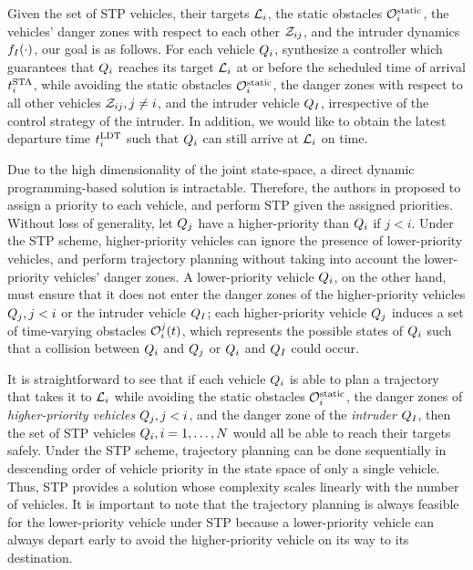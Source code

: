 Given the set of STP vehicles, their targets $\mathcal{L}_i$, the static obstacles $\mathcal{O}^\text{static}_i$, the vehicles' danger zones with respect to each other $\mathcal{Z}_{ij}$, and the intruder dynamics $f_I(\cdot)$, our goal is as follows. For each vehicle $Q_i$, synthesize a controller which guarantees that $Q_i$ reaches its target $\mathcal{L}_i$ at or before the scheduled time of arrival $t^\text{STA}_i$, while avoiding the static obstacles $\mathcal{O}^\text{static}_i$, the danger zones with respect to all other vehicles $\mathcal{Z}_{ij}, j\neq i$, and the intruder vehicle $Q_{I}$, irrespective of the control strategy of the intruder. In addition, we would like to obtain the latest departure time $t^\text{LDT}_i$ such that $Q_i$ can still arrive at $\mathcal{L}_i$ on time.

Due to the high dimensionality of the joint state-space, a direct dynamic programming-based solution is intractable. Therefore, the authors in \cite{Chen15c} proposed to assign a priority to each vehicle, and perform STP given the assigned priorities. Without loss of generality, let $Q_j$ have a higher-priority than $Q_i$ if $j<i$. Under the STP scheme, higher-priority vehicles can ignore the presence of lower-priority vehicles, and perform trajectory planning without taking into account the lower-priority vehicles' danger zones. A lower-priority vehicle $Q_i$, on the other hand, must ensure that it does not enter the danger zones of the higher-priority vehicles $Q_j, j<i$ or the intruder vehicle $Q_{I}$; each higher-priority vehicle $Q_j$ induces a set of time-varying obstacles $\mathcal{O}_i^j(t)$, which represents the possible states of $Q_i$ such that a collision between $Q_i$ and $Q_j$ or $Q_i$ and $Q_{I}$ could occur.

It is straightforward to see that if each vehicle $Q_i$ is able to plan a trajectory that takes it to $\mathcal{L}_i$ while avoiding the static obstacles $\mathcal{O}^\text{static}_i$, the danger zones of \textit{higher-priority vehicles} $Q_j, j<i$, and the danger zone of the \textit{intruder} $Q_{I}$, then the set of STP vehicles $Q_i, i=1,\ldots,N$ would all be able to reach their targets safely. Under the STP scheme, trajectory planning can be done sequentially in descending order of vehicle priority in the state space of only a single vehicle. Thus, STP provides a solution whose complexity scales linearly with the number of vehicles. It is important to note that the trajectory planning is always feasible for the lower-priority vehicle under STP because a lower-priority vehicle can always depart early to avoid the higher-priority vehicle on its way to its destination.

